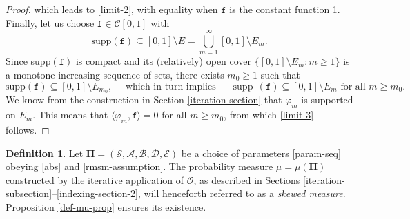\documentclass[12pt, twoside]{article}
\def\supp{\mathop\mathrm{\,supp\,}}
\theoremstyle{definition}
\newtheorem{definition}[theorem]{Definition}
\numberwithin{equation}{section}
\begin{document}
\begin{proof}
which leads to \eqref{limit-2}, with equality when $\mathtt f$ is the constant function 1.   
\vskip0.1in 
\noindent Finally, let us choose $\mathtt f \in \mathcal C[0,1]$ with 
\[ \text{supp}(\mathtt f) \subseteq [0,1] \setminus E = \bigcup_{m=1}^{\infty} [0,1] \setminus E_m. \]
Since supp$(\mathtt f)$ is compact and its (relatively) open cover $\{[0,1] \setminus E_m: m \geq 1\}$ is a monotone increasing sequence of sets, there exists $m_0 \geq 1$ such that 
\[ \text{supp}(\mathtt f) \subseteq [0,1] \setminus E_{m_0}, \quad \text{ which in turn implies }\quad \supp(\mathtt f) \subseteq [0,1] \setminus E_{m} \text{ for all } m \geq m_0. \] We know from the construction in Section \ref{iteration-section} that $\varphi_m$ is supported on $E_m$. This means that $\langle \varphi_m, \mathtt f \rangle = 0$ for all $m \geq m_0$, from which \eqref{limit-3} follows.    
\end{proof} 
\begin{definition} \label{skewed-measure-def} 
Let  $\pmb{\Pi}= (\mathcal S, \mathcal A, \mathcal B, \mathcal D, \mathcal E)$ be a choice of parameters \eqref{param-seq} obeying \eqref{abs} and \eqref{rmsm-assumption}. The probability measure $\mu = \mu(\pmb{\Pi})$ constructed by the iterative application of $\mathscr{O}$, as described in Sections \ref{iteration-subsection}--\ref{indexing-section-2},  will henceforth referred to as a {\em{skewed measure}}. Proposition \ref{def-mu-prop} ensures its existence.
\end{definition}  
\end{document}
